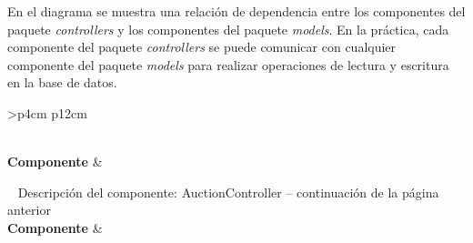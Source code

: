 En el diagrama se muestra una relación de dependencia entre los componentes del paquete \textit{controllers} y los componentes del paquete \textit{models}.
En la práctica, cada componente del paquete \textit{controllers} se puede comunicar con cualquier componente del paquete \textit{models} para realizar operaciones de lectura y escritura en la base de datos.

\begin{longtable}{
    >{}p{4cm}
    p{12cm}
    }
    \caption{Descripción del componente: AuctionController} \label{table:descripcion_auctioncontroller} \\
    \toprule
    \textbf{Componente} &  \\
    \endfirsthead
    
    {{ \tablename\ \thetable{} Descripción del componente: AuctionController -- continuación de la página anterior}} \\
    \toprule
    \textbf{Componente} &  \\
    \midrule
    \endhead
    
    \midrule
     \\ 
    \endfoot
    
    \bottomrule
    \endlastfoot
    

\end{longtable}
